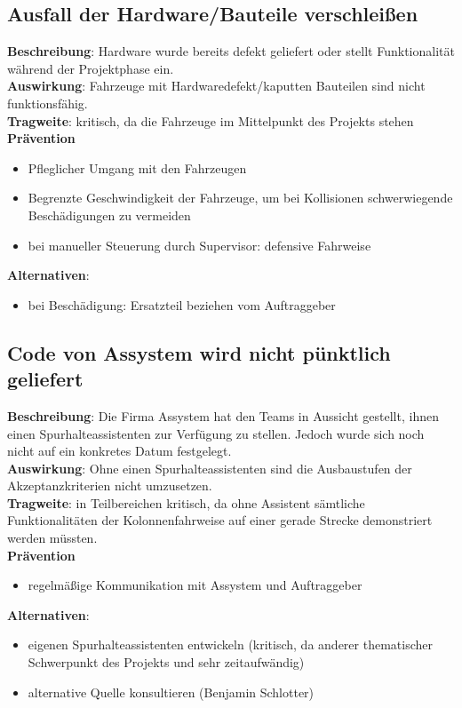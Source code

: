 \documentclass[a4paper, 12pt, titlepage]{scrartcl}
\begin{document}
	\subsection{Ausfall der Hardware/Bauteile verschlei\ss en}
		\textbf{Beschreibung}: Hardware wurde bereits defekt geliefert oder stellt Funktionalit\"at w\"ahrend der Projektphase ein.\\
		\textbf{Auswirkung}: Fahrzeuge mit Hardwaredefekt/kaputten Bauteilen sind nicht funktionsf\"ahig.\\
		\textbf{Tragweite}: kritisch, da die Fahrzeuge im Mittelpunkt des Projekts stehen\\
		\textbf{Pr\"avention}
			\begin{itemize}
				\item Pfleglicher Umgang mit den Fahrzeugen
				\item Begrenzte Geschwindigkeit der Fahrzeuge, um bei Kollisionen schwerwiegende Besch\"adigungen zu vermeiden
				\item bei manueller Steuerung durch Supervisor: defensive Fahrweise
			\end{itemize}
		\textbf{Alternativen}: 
			\begin{itemize}
				\item bei Besch\"adigung: Ersatzteil beziehen vom Auftraggeber
			\end{itemize}
		
	\subsection{Code von Assystem wird nicht p\"unktlich geliefert}
		\textbf{Beschreibung}: Die Firma Assystem hat den Teams in Aussicht gestellt, ihnen einen Spurhalteassistenten zur Verf\"ugung zu stellen. Jedoch wurde sich noch nicht auf ein konkretes Datum festgelegt. \\
		\textbf{Auswirkung}: Ohne einen Spurhalteassistenten sind die Ausbaustufen der Akzeptanzkriterien nicht umzusetzen.\\
		\textbf{Tragweite}: in Teilbereichen kritisch, da ohne Assistent s\"amtliche Funktionalit\"aten der Kolonnenfahrweise auf einer gerade Strecke demonstriert werden m\"ussten.\\
		\textbf{Pr\"avention}
			\begin{itemize}
				\item regelm\"a\ss ige Kommunikation mit Assystem und Auftraggeber
			\end{itemize}
		\textbf{Alternativen}: 
			\begin{itemize}
				\item eigenen Spurhalteassistenten entwickeln (kritisch, da anderer thematischer Schwerpunkt des Projekts und sehr zeitaufw\"andig)
				\item alternative Quelle konsultieren (Benjamin Schlotter)
			\end{itemize}
		
\end{document}
